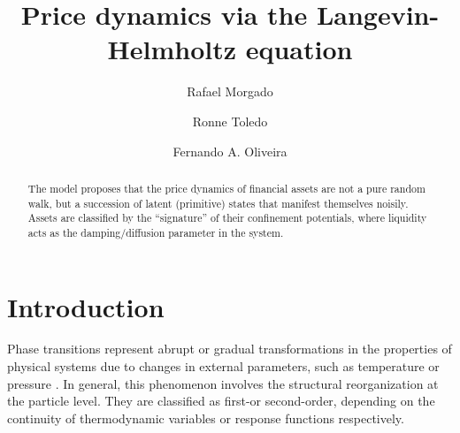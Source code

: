 \documentclass[pre,aps,twocolumn,showpacs,floatfix,nofootinbib,superscriptaddress,linenumbers]{revtex4-1}
\begin{document}
\title{ Price dynamics via the Langevin-Helmholtz equation}
\author{Rafael Morgado}
\address{International Center of Physics, Institute of Physics, University of Brasilia, 70910-900, Brasilia, Federal District, Brazil}
\author{Ronne Toledo}
\address{International Center of Physics, Institute of Physics, University of Brasilia, 70910-900, Brasilia, Federal District, Brazil}
\author{Fernando A. Oliveira}
\address{International Center of Physics, Institute of Physics, University of Brasilia, 70910-900, Brasilia, Federal District, Brazil}
\begin{abstract}
  
  The model proposes that the price dynamics of financial assets are not a pure random walk, but a succession of latent (primitive) states
that manifest themselves noisily. Assets are classified by the “signature” of their confinement potentials, where liquidity acts as the damping/diffusion parameter in the system.

\end{abstract}
\maketitle
\section{Introduction}
\label{Int}
Phase transitions represent abrupt or gradual transformations in the properties of physical systems due to changes in external parameters, such as temperature or pressure \cite{Kardar07}. In general, this phenomenon involves the structural reorganization at the particle level. They are classified as first-or second-order, depending on the continuity of thermodynamic variables or response functions respectively.
\end{document}
